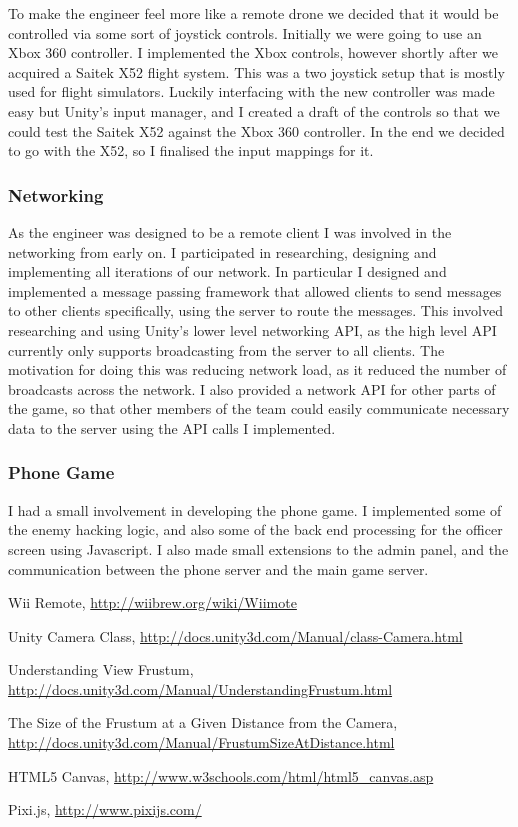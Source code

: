 \documentclass[a4paper,11pt]{article}
\begin{document}
To make the engineer feel more like a remote drone we decided that it would be controlled via some sort of joystick controls. Initially we were going to use an Xbox 360 controller. I implemented the Xbox controls, however shortly after we acquired a Saitek X52 flight system. This was a two joystick setup that is mostly used for flight simulators. Luckily interfacing with the new controller was made easy but Unity’s input manager, and I created a draft of the controls so that we could test the Saitek X52 against the Xbox 360 controller. In the end we decided to go with the X52, so I finalised the input mappings for it.

\subsubsection{Networking}

As the engineer was designed to be a remote client I was involved in the networking from early on. I participated in researching, designing and implementing all iterations of our network. In particular I designed and implemented a message passing framework that allowed clients to send messages to other clients specifically, using the server to route the messages. This involved researching and using Unity’s lower level networking API, as the high level API currently only supports broadcasting from the server to all clients. The motivation for doing this was reducing network load, as it reduced the number of broadcasts across the network. I also provided a network API for other parts of the game, so that other members of the team could easily communicate necessary data to the server using the API calls I implemented.

\subsubsection{Phone Game}

I had a small involvement in developing the phone game. I implemented some of the enemy hacking logic, and also some of the back end processing for the officer screen using Javascript. I also made small extensions to the admin panel, and the communication between the phone server and the main game server.

\begin{thebibliography}{9}

  Wii Remote,
  \url{http://wiibrew.org/wiki/Wiimote}

  Unity Camera Class,
  \url{http://docs.unity3d.com/Manual/class-Camera.html}
  
  Understanding View Frustum,
  \url{http://docs.unity3d.com/Manual/UnderstandingFrustum.html}

  The Size of the Frustum at a Given Distance from the Camera,
  \url{http://docs.unity3d.com/Manual/FrustumSizeAtDistance.html}

  HTML5 Canvas,
  \url{http://www.w3schools.com/html/html5_canvas.asp}

  Pixi.js,
  \url{http://www.pixijs.com/}

\end{thebibliography}
\end{document}
